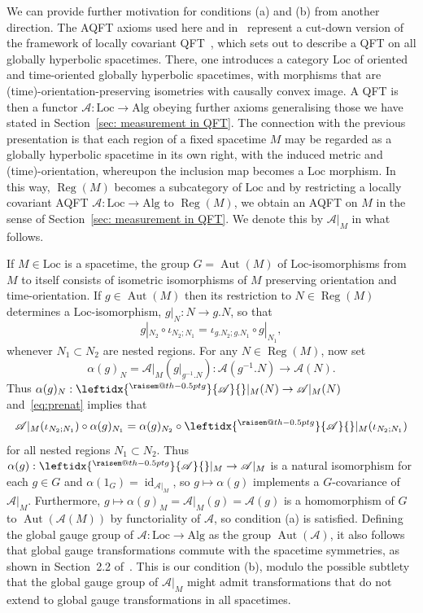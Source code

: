 \documentclass[sn-mathphys-num]{sn-jnl}%
\makeatletter
\newcommand{\raisemath}[1]{\mathpalette{\raisem@th{#1}}}
\newcommand{\raisem@th}[3]{\raisebox{#1}{$#2#3$}}
\newcommand{\act}[2]{\leftidx{^{\raisemath{-0.5pt}{#1}}}{#2}{}}
\newcommand{\Af}{\mathscr{A}}
\DeclareMathOperator{\id}{id}
\DeclareMathOperator{\Aut}{Aut}
\DeclareMathOperator{\Reg}{Reg}
\newcommand{\Alg}{\mathrm{Alg}}
\newcommand{\Loc}{\mathrm{Loc}}
\numberwithin{equation}{section}
\theoremstyle{thmstyleone}%
\theoremstyle{thmstyletwo}%
\theoremstyle{thmstylethree}%
\makeatother
\begin{document}
 We can provide further motivation for conditions (a) and (b) from another direction. The AQFT axioms used here and in~\cite{FewVer_QFLM:2018} represent a cut-down version of the framework of locally covariant QFT~\cite{BrFrVe03,FewVerch_aqftincst:2015}, which sets out to describe a QFT on all globally hyperbolic spacetimes. There, one introduces a category $\Loc$ of oriented and time-oriented globally hyperbolic spacetimes, with morphisms that are (time)-orientation-preserving isometries with causally convex image. A QFT is then a functor $\Af:\Loc\to\Alg$ obeying further axioms generalising those we have stated in Section~\ref{sec: measurement in QFT}. The connection with the previous presentation is that each region of a fixed spacetime $M$ may be regarded as a globally hyperbolic spacetime in its own right, with the induced metric and (time)-orientation, whereupon the inclusion map becomes a $\Loc$ morphism. In this way, $\Reg(M)$ becomes a subcategory of $\Loc$ and by restricting a locally covariant AQFT $\Af:\Loc\to\Alg$ to $\Reg(M)$, we obtain an AQFT on $M$ in the sense of Section~\ref{sec: measurement in QFT}. We denote this by $\Af|_M$ in what follows. 
 
 If $M\in\Loc$ is a spacetime, the group $G=\Aut(M)$ of $\Loc$-isomorphisms from $M$ to itself consists of isometric isomorphisms of $M$ preserving orientation and time-orientation. If $g\in \Aut(M)$ then its restriction to $N\in\Reg(M)$ determines a $\Loc$-isomorphism, $g|_N:N\to g.N$, so that 
 \begin{equation}\label{eq:prenat}
     g|_{N_2}\circ\iota_{N_2;N_1} = \iota_{g.N_2;g.N_1}\circ g|_{N_1},
 \end{equation}
 whenever $N_1\subset N_2$ are nested regions. 
 For any $N\in\Reg(M)$, now set 
 \begin{equation}
 \alpha(g)_N=\Af|_M(g|_{g^{-1}.N}):\Af(g^{-1}.N)\to \Af(N).
 \end{equation}
 Thus $\alpha(g)_N:\act{g}{\Af}|_M(N)\to\Af|_M(N)$ and~\eqref{eq:prenat} implies that 
 \begin{equation}
 \Af|_M(\iota_{N_2;N_1})\circ \alpha(g)_{N_1}= \alpha(g)_{N_2}\circ\act{g}{\Af}|_M(\iota_{N_2;N_1})
 \end{equation}
 for all nested regions $N_1\subset N_2$. Thus
 $\alpha(g):\act{g}{\Af}|_M\to \Af|_M$ is a natural isomorphism for each $g\in G$ and
 $\alpha(1_G)=\id_{\Af|_M}$, so $g\mapsto\alpha(g)$ implements a $G$-covariance of $\Af|_M$. Furthermore, $g\mapsto \alpha(g)_M=\Af|_M(g)=\Af(g)$ is a homomorphism of
 $G$ to $\Aut(\Af(M))$ by functoriality of $\Af$, so condition (a) is satisfied. 
 Defining the global gauge group of $\Af:\Loc\to \Alg$ as the group $\Aut(\Af)$, it also follows that global gauge transformations commute with the spacetime symmetries, as shown in Section~2.2 of~\cite{Fewster:gauge}. This is our condition (b), modulo the possible subtlety that the global gauge group of $\Af|_M$ might admit transformations that do not extend to global gauge transformations in all spacetimes.
\end{document}
